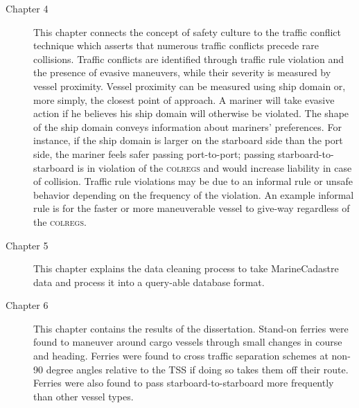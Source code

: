 \documentclass[twoside,symmetric,notoc]{tufte-book}
\begin{document}
{\begin{description}
\item[Chapter 4] This chapter connects the concept of safety culture to the traffic conflict technique which asserts that numerous traffic conflicts precede rare collisions. Traffic conflicts are identified through traffic rule violation and the presence of evasive maneuvers, while their severity is measured by vessel proximity. Vessel proximity can be measured using ship domain or, more simply, the closest point of approach. A mariner will take evasive action if he believes his ship domain will otherwise be violated. The shape of the ship domain conveys information about mariners' preferences. For instance, if the ship domain is larger on the starboard side than the port side, the mariner feels safer passing port-to-port; passing starboard-to-starboard is in violation of the \textsc{colregs} and would increase liability in case of collision. Traffic rule violations may be due to an informal rule or unsafe behavior depending on the frequency of the violation. An example informal rule is for the faster or more maneuverable vessel to give-way regardless of the \textsc{colregs}. 

\item[Chapter 5] This chapter explains the data cleaning process to take MarineCadastre data and process it into a query-able database format. 

\item[Chapter 6] This chapter contains the results of the dissertation. Stand-on ferries were found to maneuver around cargo vessels through small changes in course and heading. Ferries were found to cross traffic separation schemes at non-90 degree angles relative to the TSS if doing so takes them off their route. Ferries were also found to pass starboard-to-starboard more frequently than other vessel types.


\end{description}
}


\end{document}
